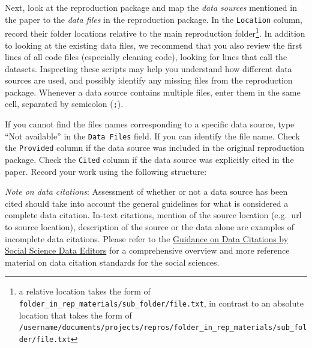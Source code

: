 \documentclass[
  openany]{book}
\begin{document}
Next, look at the reproduction package and map the \emph{data sources} mentioned in the paper to the \emph{data files} in the reproduction package. In the \texttt{Location} column, record their folder locations relative to the main reproduction folder\footnote{a relative location takes the form of \texttt{folder\_in\_rep\_materials/sub\_folder/file.txt}, in contrast to an absolute location that takes the form of \texttt{/username/documents/projects/repros/folder\_in\_rep\_materials/sub\_folder/file.txt}}. In addition to looking at the existing data files, we recommend that you also review the first lines of all code files (especially cleaning code), looking for lines that call the datasets. Inspecting these scripts may help you understand how different data sources are used, and possibly identify any missing files from the reproduction package. Whenever a data source contains multiple files, enter them in the same cell, separated by semicolon (\texttt{;}).

If you cannot find the files names corresponding to a specific data source, type ``Not available'' in the \texttt{Data\ Files} field. If you can identify the file name. Check the \texttt{Provided} column if the data source was included in the original reproduction package. Check the \texttt{Cited} column if the data source was explicitly cited in the paper. Record your work using the following structure:

\begin{table}[!h]

\caption{\label{tab:raw-data-information}Raw data information}
\centering
{}
\end{table}

\emph{Note on data citations}: Assessment of whether or not a data source has been cited should take into account the general guidelines for what is considered a complete data citation. In-text citations, mention of the source location (e.g.~url to source location), description of the source or the data alone are examples of incomplete data citations. Please refer to the \href{https://social-science-data-editors.github.io/guidance/addtl-data-citation-guidance.html\#generic-guidance}{Guidance on Data Citations by Social Science Data Editors} for a comprehensive overview and more reference material on data citation standards for the social sciences.
\end{document}
